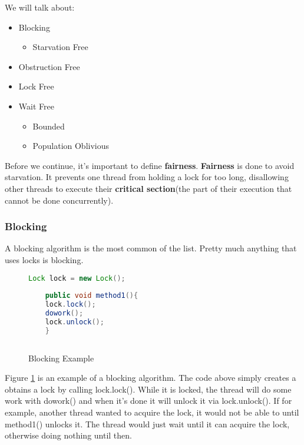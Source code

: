 \documentclass[letterpaper, 12pt]{article}
\begin{document}
We will talk about:

\begin{itemize}
	\item Blocking
	\begin{itemize}
		\item Starvation Free
	\end{itemize}
	\item Obstruction Free
	\item Lock Free
	\item Wait Free
	\begin{itemize}
		\item Bounded
		\item Population Oblivious
	\end{itemize}
\end{itemize}

\newpage

Before we continue, it's important to define {\bfseries fairness}. {\bfseries Fairness} 
is done to avoid starvation. It prevents one thread from holding a lock for too long, 
disallowing other threads to execute their {\bfseries critical section}(the part of 
their execution that cannot be done concurrently).

\subsubsection{Blocking}
A blocking algorithm is the most common of the list. Pretty much anything that uses locks is 
blocking. 



\begin{figure}
	\begin{lstlisting}[language=Java]
	Lock lock = new Lock();
	
	public void method1(){
	lock.lock();
	dowork();
	lock.unlock();
	}
	
	\end{lstlisting}
	\caption{Blocking Example} \label{fig:blocking_ex}
\end{figure}

Figure \ref{fig:blocking_ex} is an example of a blocking algorithm.
The code above simply creates a obtains a lock by calling lock.lock(). While it is locked, 
the thread will do some work with dowork() and when it's done it will unlock it via 
lock.unlock(). If for example, another thread wanted to acquire the lock, it would not be 
able to until method1() unlocks it. The thread would just wait until it can acquire the 
lock, otherwise doing nothing until then.
\end{document}
